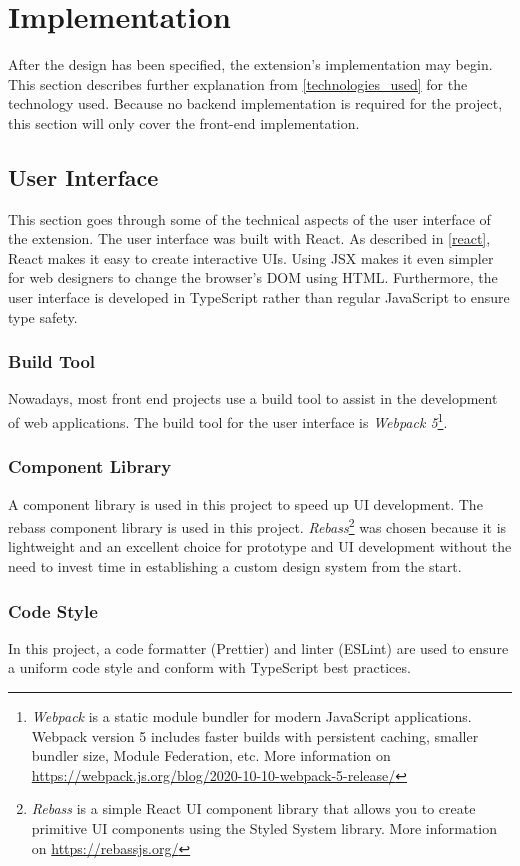 \newpage
\chapter{Implementation}
After the design has been specified, the extension's implementation may begin. This section describes further explanation from \autoref{technologies_used} for the technology used. Because no backend implementation is required for the project, this section will only cover the front-end implementation.

\section{User Interface}
This section goes through some of the technical aspects of the user interface of the extension. The user interface was built with React. As described in \autoref{react}, React makes it easy to create interactive UIs. Using JSX makes it even simpler for web designers to change the browser's DOM using HTML. Furthermore, the user interface is developed in TypeScript rather than regular JavaScript to ensure type safety.

\subsection{Build Tool}
Nowadays, most front end projects use a build tool to assist in the development of web applications. The build tool for the user interface is \emph{Webpack 5}\footnote{\emph{Webpack} is a static module bundler for modern JavaScript applications. Webpack version 5 includes faster builds with persistent caching, smaller bundler size, Module Federation, etc. More information on \url{https://webpack.js.org/blog/2020-10-10-webpack-5-release/}}.

\subsection{Component Library}
A component library is used in this project to speed up UI development. The rebass component library is used in this project. \emph{Rebass}\footnote{\emph{Rebass} is a simple React UI component library that allows you to create primitive UI components using the Styled System library. More information on \url{https://rebassjs.org/}} was chosen because it is lightweight and an excellent choice for prototype and UI development without the need to invest time in establishing a custom design system from the start.

\subsection{Code Style}
In this project, a code formatter (Prettier) and linter (ESLint) are used to ensure a uniform code style and conform with TypeScript best practices.

